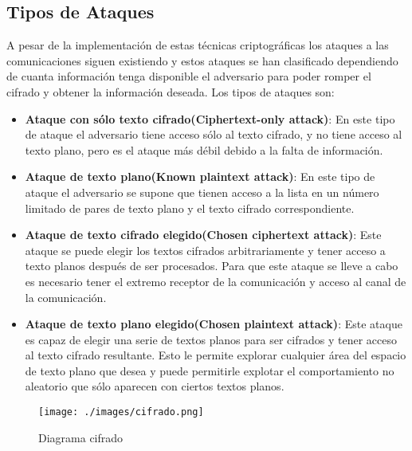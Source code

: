 \documentclass[12pt,oneside,onecolumn,openany]{report}
\begin{document}
\subsection{Tipos de Ataques}
A  pesar  de  la  implementación  de  estas  técnicas  criptográficas  los  ataques  a  las comunicaciones  siguen  existiendo  y  estos  ataques  se  han  clasificado  dependiendo  de 
cuanta  información  tenga  disponible  el  adversario  para  poder  romper  el  cifrado  y obtener la información deseada.\cite{at} Los tipos de ataques son:
\begin{itemize}
 \item \textbf{Ataque con sólo texto cifrado(Ciphertext-only  attack)}: En este tipo de ataque el adversario tiene acceso sólo al texto cifrado, y no tiene acceso al texto plano, pero es el ataque más débil debido a la falta de información.
 \item \textbf{Ataque de texto plano(Known plaintext attack)}: En este tipo de ataque el adversario se supone que tienen acceso a la lista en un número limitado de pares de texto plano y el texto cifrado correspondiente.
 \item \textbf{Ataque de texto cifrado elegido(Chosen ciphertext attack)}: Este ataque se puede elegir los textos cifrados arbitrariamente y tener acceso a texto planos después de ser procesados. Para que este ataque se lleve a cabo es necesario tener el extremo receptor de la comunicación y acceso al canal de la comunicación.
 \item \textbf{Ataque de texto plano elegido(Chosen plaintext attack)}: Este ataque es capaz de elegir una serie de textos planos para ser cifrados y tener acceso al texto cifrado resultante. Esto le permite explorar cualquier área del espacio de  texto plano que desea y puede permitirle explotar el comportamiento no aleatorio que sólo aparecen con ciertos textos planos.
\end{itemize}


\begin{figure}[H]
	\texttt{[image: ./images/cifrado.png]}
	\caption{Diagrama cifrado}
	\label{fig:1-1-1}
\end{figure}
\end{document}
